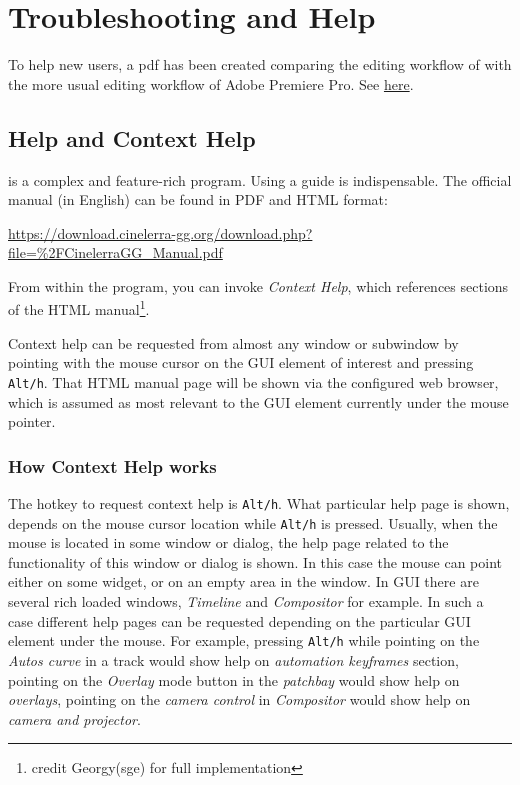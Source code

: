 \chapter{Troubleshooting and Help}%
\label{cha:troubleshooting_help}

To help new users, a pdf has been created comparing the editing workflow of \CGG{} with the more usual editing workflow of Adobe Premiere Pro. See \href{https://cinelerra-gg.org/download/Workflow.pdf}{here}.

\section{Help and Context Help}%
\label{sec:help_context_help}

\CGG{} is a complex and feature-rich program. Using a guide is indispensable. The official manual (in English) can be found in PDF and HTML format:

\url{https://download.cinelerra-gg.org/download.php?file=\%2FCinelerraGG_Manual.pdf}\newline

From within the program, you can invoke \textit{Context Help}, which references sections of the HTML manual\protect\footnote{credit Georgy(sge) for full implementation}.

Context help can be requested from almost any \CGG{} window or subwindow by pointing with the mouse cursor on the GUI element of interest and pressing \texttt{Alt/h}. That HTML manual page will be shown via the configured web browser, which is assumed as most relevant to the GUI element currently under the mouse pointer.

\subsection{How Context Help works}%
\label{sub:how_context_help_works}

The hotkey to request context help is \texttt{Alt/h}. What particular help page is shown, depends on the mouse cursor location while \texttt{Alt/h} is pressed. Usually, when the mouse is located in some window or dialog, the help page related to the functionality of this window or dialog is shown. In this case the mouse can point either on some widget, or on an empty area in the window. In \CGG{} GUI there are several rich loaded windows, \textit{Timeline} and \textit{Compositor} for example. In such a case different help pages can be requested depending on the particular GUI element under the mouse. For example, pressing \texttt{Alt/h} while pointing on the \textit{Autos curve} in a track would show help on \textit{automation keyframes} section, pointing on the \textit{Overlay} mode button in the \textit{patchbay} would show help on \textit{overlays}, pointing on the \textit{camera control} in \textit{Compositor} would show help on \textit{camera and projector}.

